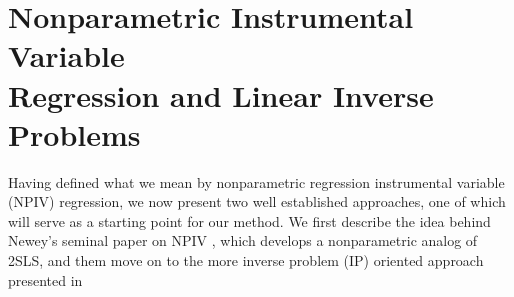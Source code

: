 \chapter{Nonparametric Instrumental Variable \\Regression and Linear Inverse Problems}

Having defined what we mean by nonparametric regression instrumental variable (NPIV) regression, we now present two well established approaches, one of which will serve as a starting point for our method.
We first describe the idea behind Newey's seminal paper on NPIV \cite{newey2003}, which develops a nonparametric analog of 2SLS, and them move on to the more inverse problem (IP) oriented approach presented in \cite{florens2007}
